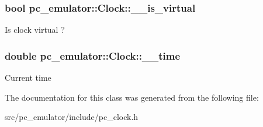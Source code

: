 \subsubsection[{\texorpdfstring{\+\_\+\+\_\+is\+\_\+virtual}{__is_virtual}}]{\setlength{\rightskip}{0pt plus 5cm}bool pc\+\_\+emulator\+::\+Clock\+::\+\_\+\+\_\+is\+\_\+virtual}\hypertarget{classpc__emulator_1_1Clock_a0f6af10c0d261885b85149902e273725}{}\label{classpc__emulator_1_1Clock_a0f6af10c0d261885b85149902e273725}
Is clock virtual ? 
\subsubsection[{\texorpdfstring{\+\_\+\+\_\+time}{__time}}]{\setlength{\rightskip}{0pt plus 5cm}double pc\+\_\+emulator\+::\+Clock\+::\+\_\+\+\_\+time}\hypertarget{classpc__emulator_1_1Clock_ad9198c0f45039a5b22c1404bdd245679}{}\label{classpc__emulator_1_1Clock_ad9198c0f45039a5b22c1404bdd245679}
Current time 

The documentation for this class was generated from the following file\+:\begin{DoxyCompactItemize}
\item 
src/pc\+\_\+emulator/include/pc\+\_\+clock.\+h\end{DoxyCompactItemize}
